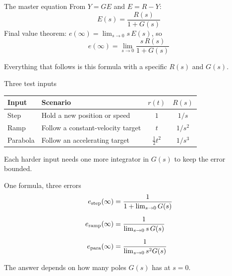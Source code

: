 \documentclass[aspectratio=169,11pt]{beamer}
\begin{document}
\begin{frame}{The master equation}
  From $Y = G E$ and $E = R - Y$:
  \[
    E(s) = \frac{R(s)}{1 + G(s)}
  \]
  Final value theorem: $e(\infty) = \lim_{s\to 0} s\,E(s)$, so
  \[
    \boxed{\,e(\infty) = \lim_{s \to 0} \frac{s\,R(s)}{1 + G(s)}\,}
  \]

  \medskip
  Everything that follows is this formula with a specific $R(s)$ and $G(s)$.
\end{frame}

\begin{frame}{Three test inputs}
  \begin{center}
  \begin{tabular}{llcc}
    \toprule
    Input    & Scenario                          & $r(t)$           & $R(s)$  \\
    \midrule
    Step     & Hold a new position or speed      & $1$              & $1/s$   \\
    Ramp     & Follow a constant-velocity target & $t$              & $1/s^2$ \\
    Parabola & Follow an accelerating target     & $\tfrac12 t^2$   & $1/s^3$ \\
    \bottomrule
  \end{tabular}
  \end{center}

  \bigskip
  Each harder input needs one more integrator in $G(s)$ to keep the error bounded.
\end{frame}

\begin{frame}{One formula, three errors}
  \begin{align*}
    e_{\rm step}(\infty) &= \frac{1}{1 + \lim_{s\to 0} G(s)} \\[6pt]
    e_{\rm ramp}(\infty) &= \frac{1}{\lim_{s\to 0} s\,G(s)} \\[6pt]
    e_{\rm para}(\infty) &= \frac{1}{\lim_{s\to 0} s^2 G(s)}
  \end{align*}

  \medskip
  The answer depends on how many poles $G(s)$ has at $s = 0$.
\end{frame}
\end{document}
